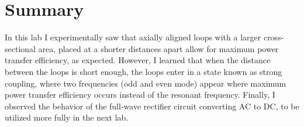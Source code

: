 \documentclass{article}
\begin{document}
\section{Summary}
In this lab I experimentally saw that axially aligned loops with a larger cross-sectional area, placed at a shorter distances apart allow for maximum power transfer efficiency, as expected. However, I learned that when the distance between the loops is short enough, the loops enter in a state known as strong coupling, where two frequencies (odd and even mode) appear where maximum power transfer efficiency occurs instead of the resonant frequency. Finally, I observed the behavior of the full-wave rectifier circuit converting AC to DC, to be utilized more fully in the next lab.
\end{document}
